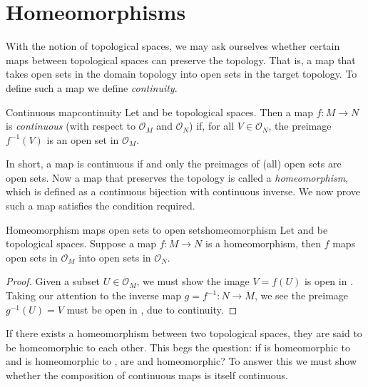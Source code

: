 \section{Homeomorphisms}

With the notion of topological spaces, we may ask ourselves whether certain maps between topological spaces can preserve the topology. That is, a map that takes open sets in the domain topology into open sets in the target topology. To define such a map we define \emph{continuity}.

\begin{definition}{Continuous map}{continuity}
    Let  and  be topological spaces. Then a map \(f : M \to N\) is \emph{continuous} (with respect to \(\mathcal{O}_M\) and \(\mathcal{O}_N\)) if, for all \(V \in \mathcal{O}_N\), the preimage \(f^{-1}(V)\) is an open set in \(\mathcal{O}_M\).
\end{definition}

In short, a map is continuous if and only the preimages of (all) open sets are open sets. Now a map that preserves the topology is called a \emph{homeomorphism}, which is defined as a continuous bijection with continuous inverse. We now prove such a map satisfies the condition required.

\begin{proposition}{Homeomorphism maps open sets to open sets}{homeomorphism}
    Let  and  be topological spaces. Suppose a map \(f : M \to N\) is a homeomorphism, then \(f\) maps open sets in \(\mathcal{O}_M\) into open sets in \(\mathcal{O}_N\).
\end{proposition}
\begin{proof}
    Given a subset \(U \in \mathcal{O}_M\), we must show the image \(V = f(U)\) is open in . Taking our attention to the inverse map \(g = f^{-1} : N \to M\), we see the preimage \(g^{-1}(U) = V\) must be open in , due to continuity.
\end{proof}

If there exists a homeomorphism between two topological spaces, they are said to be homeomorphic to each other. This begs the question: if  is homeomorphic to  and  is homeomorphic to , are  and  homeomorphic? To answer this we must show whether the composition of continuous maps is itself continuous.

